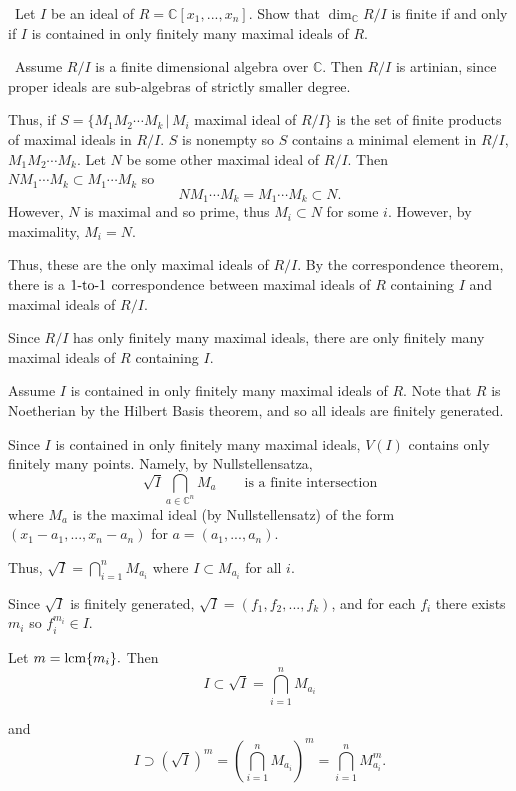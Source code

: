 \documentclass[12pt]{AlgebraQual}
\begin{document}
\begin{problem} $\,$
Let $I$ be an ideal of $R=\mathbb{C}[x_1,...,x_n]$. Show that $\dim_\mathbb{C}R/I$ is finite if and only if $I$ is contained in only finitely many maximal ideals of $R.$
\end{problem}


\begin{solution}$\,$
\boxed{\implies} Assume $R/I$ is a finite dimensional algebra over $\mathbb{C}$. Then $R/I$ is artinian, since proper ideals are sub-algebras of strictly smaller degree.

Thus, if $S=\{M_1M_2\cdots M_k\,|\, M_i$ maximal ideal of $R/I\}$ is the set of finite products of maximal ideals in $R/I$. $S$ is nonempty so $S$ contains a minimal element in $R/I$, $M_1M_2\cdots M_k$. Let $N$ be some other maximal ideal of $R/I$. Then $NM_1\cdots M_k\subset M_1\cdots M_k$ so $$NM_1\cdots M_k= M_1\cdots M_k\subset N.$$ However, $N$ is maximal and so prime, thus $M_i\subset N$ for some $i$. However, by maximality, $M_i=N$.

Thus, these are the only maximal ideals of $R/I$. By the correspondence theorem, there is a $1\text{-to-}1$ correspondence between maximal ideals of $R$ containing $I$ and maximal ideals of $R/I$.

Since $R/I$ has only finitely many maximal ideals, there are only finitely many maximal ideals of $R$ containing $I.$

\boxed{\impliedby} Assume $I$ is contained in only finitely many maximal ideals of $R$. Note that $R$ is Noetherian by the Hilbert Basis theorem, and so all ideals are finitely generated.

Since $I$ is contained in only finitely many maximal ideals, $V(I)$ contains only finitely many points. Namely, by Nullstellensatza, $$\sqrt{I}\bigcap_{a\in\mathbb{C}^n}M_a\qquad \text{is a finite intersection}$$ where $M_a$ is the maximal ideal (by Nullstellensatz) of the form $(x_1-a_1,...,x_n-a_n)$ for $a=(a_1,...,a_n)$.

Thus, $\sqrt{I}=\bigcap_{i=1}^nM_{a_i}$ where $I\subset M_{a_i}$ for all $i$.

Since $\sqrt{I}$ is finitely generated, $\sqrt{I}=(f_1,f_2,...,f_k)$, and for each $f_i$ there exists $m_i$ so $f_i^{m_i}\in I$.

Let $m=\text{lcm}\{m_i\}.$ Then $$I\subset\sqrt{I}=\bigcap_{i=1}^nM_{a_i}$$

and $$I\supset (\sqrt{I})^m=\left(\bigcap_{i=1}^nM_{a_i}\right)^m=\bigcap_{i=1}^nM_{a_i}^m.$$


\end{solution}
\end{document}
